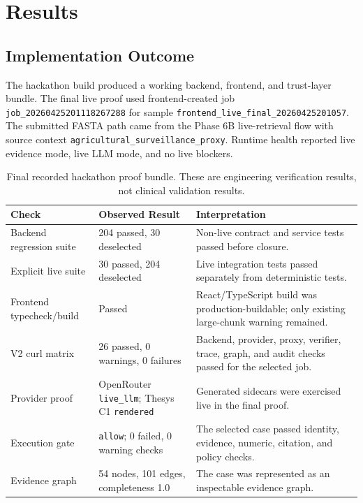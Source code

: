 \documentclass[11pt, letterpaper]{article}
\begin{document}
\section{Results}

\subsection*{Implementation Outcome}

The hackathon build produced a working backend, frontend, and trust-layer bundle. The final live proof used frontend-created job \texttt{job\_20260425201118267288} for sample \texttt{frontend\_live\_final\_20260425201057}. The submitted FASTA path came from the Phase 6B live-retrieval flow with source context \texttt{agricultural\_surveillance\_proxy}. Runtime health reported live evidence mode, live LLM mode, and no live blockers.

\begin{table}[H]
\centering
\small
\begin{tabularx}{\textwidth}{p{}p{}X}
\toprule
\textbf{Check} & \textbf{Observed Result} & \textbf{Interpretation} \\
\midrule
Backend regression suite & 204 passed, 30 deselected & Non-live contract and service tests passed before closure. \\
Explicit live suite & 30 passed, 204 deselected & Live integration tests passed separately from deterministic tests. \\
Frontend typecheck/build & Passed & React/TypeScript build was production-buildable; only existing large-chunk warning remained. \\
V2 curl matrix & 26 passed, 0 warnings, 0 failures & Backend, provider, proxy, verifier, trace, graph, and audit checks passed for the selected job. \\
Provider proof & OpenRouter \texttt{live\_llm}; Thesys C1 \texttt{rendered} & Generated sidecars were exercised live in the final proof. \\
Execution gate & \texttt{allow}; 0 failed, 0 warning checks & The selected case passed identity, evidence, numeric, citation, and policy checks. \\
Evidence graph & 54 nodes, 101 edges, completeness 1.0 & The case was represented as an inspectable evidence graph. \\
\bottomrule
\end{tabularx}
\caption{Final recorded hackathon proof bundle. These are engineering verification results, not clinical validation results.}
\label{tab:proof}
\end{table}
\end{document}
